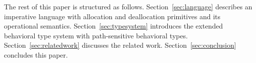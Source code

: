 The rest of this paper is structured as
follows. Section~\ref{sec:language} describes an imperative language
with allocation and deallocation primitives and its operational
semantics. Section~\ref{sec:typesystem} introduces the extended
behavioral type system with path-sensitive behavioral
types. %
Section~\ref{sec:relatedwork} discusses the related work.
Section~\ref{sec:conclusion} concludes this paper.
